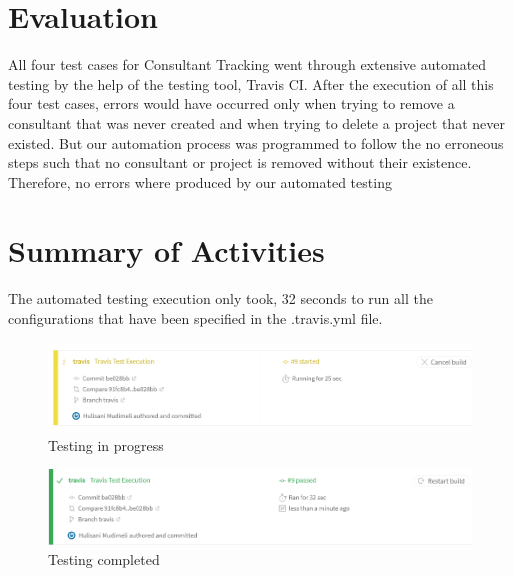 \documentclass[a4paper, 12pt, oneside]{article}
\begin{document}
\pagebreak
\section{Evaluation}

All four test cases for Consultant Tracking went through extensive automated testing by the help of the testing tool, Travis CI. After the execution of all this four test cases, errors would have occurred only when trying to remove a consultant that was never created and when trying to delete a project that never existed. But our automation process was programmed to follow the no erroneous steps such that no consultant or project is removed without their existence. Therefore, no errors where produced by our automated testing

\section{Summary of Activities}

The automated testing execution only took, 32 seconds to run all the configurations that have been specified in the .travis.yml file.
\begin{figure}[!htb]

  \centering

   \includegraphics[width=\linewidth]{images/Capture.png}

\caption{Testing in progress}

 \label{fig:sfig1}

\end{figure}

\begin{figure}[h]

  \centering

   \includegraphics[width=\linewidth]{images/Capture3.png}

\caption{Testing completed}

 \label{fig:sfig1}

\end{figure}
\end{document}
